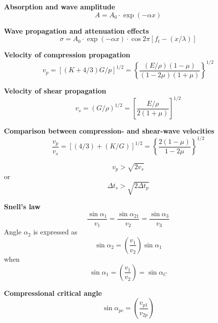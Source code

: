 \textbf{Absorption and wave amplitude}
\begin{equation*}
    A = A_0\cdot\exp(-\alpha x)\tag{7.15}
\end{equation*}

\textbf{Wave propagation and attenuation effects}
\begin{equation*}
    \sigma = A_0\cdot\exp(-\alpha x)\cdot\cos2\pi\left[ f_t - (x/\lambda) \right]\tag{7.16}
\end{equation*}

\textbf{Velocity of compression propagation}
\begin{equation*}
    v_p = \left[ (K + 4/3) G / p \right]^{1/2} = \left\{ \frac{(E/\rho) (1-\mu)}{(1-2\mu)(1+\mu)} \right\}^{1/2}\tag{7.17, 7.18}
\end{equation*}

\textbf{Velocity of shear propagation}
\begin{equation*}
    v_s = \left( G/\rho \right)^{1/2} = \left[ \frac{E/\rho}{2(1+\mu)} \right]^{1/2}\tag{7.19, 7.20}
\end{equation*}

\textbf{Comparison between compression- and shear-wave velocities}
\begin{equation*}
    \frac{v_p}{v_s} = \left[ (4/3) + (K/G) \right]^{1/2} = \left\{ \frac{2(1-\mu)}{1 - 2\mu} \right\}^{1/2}\tag{7.21, 7.22}
\end{equation*}

\begin{equation*}
    v_p > \sqrt{2v_s}\tag{7.23}
\end{equation*}
or
\begin{equation*}
    \Delta t_s > \sqrt{2\Delta t_p}\tag{7.24}
\end{equation*}

\textbf{Snell's law}
\begin{equation*}
    \frac{\sin\alpha_1}{v_1} = \frac{\sin\alpha_{21}}{v_2} = \frac{\sin\alpha_3}{v_3}\tag{7.25}
\end{equation*}
Angle $\alpha_2$ is expressed as
\begin{equation*}
    \sin\alpha_2 = \left( \frac{v_1}{v_2} \right)\sin\alpha_1\tag{7.26}
\end{equation*}
when
\begin{equation*}
    \sin\alpha_1 = \left( \frac{v_1}{v_2} \right) = \sin\alpha_C\tag{7.27}
\end{equation*}

\textbf{Compressional critical angle}
\begin{equation*}
    \sin\alpha_{pc} = \left( \frac{v_{p1}}{v_{2p}} \right)\tag{7.28}
\end{equation*}

